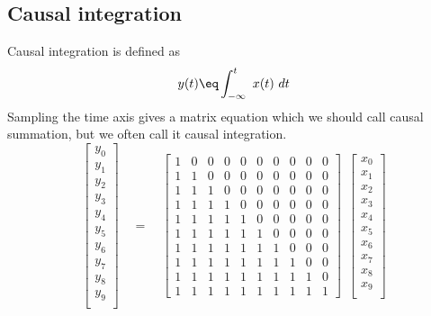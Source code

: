 \subsection{Causal integration}
Causal integration is defined as
\begin{equation}
y(t) \eq \int_{-\infty}^t \ x(t)\ dt
\end{equation}
Sampling the time axis gives a matrix equation which
we should call causal summation, but we often call it causal integration.
\begin{equation}
  \left[
	\begin{array}{c}
		y_0 \\
		y_1 \\
		y_2 \\
		y_3 \\
		y_4 \\
		y_5 \\
		y_6 \\
		y_7 \\
		y_8 \\
		y_9 \\
	\end{array}
  \right]
 \quad = \quad
  \left[
	\begin{array}{ccccccccccc}
	1 &0 &0 &0 &0 &0 &0 &0 &0 &0 \\
	1 &1 &0 &0 &0 &0 &0 &0 &0 &0 \\
	1 &1 &1 &0 &0 &0 &0 &0 &0 &0 \\
	1 &1 &1 &1 &0 &0 &0 &0 &0 &0 \\
	1 &1 &1 &1 &1 &0 &0 &0 &0 &0 \\
	1 &1 &1 &1 &1 &1 &0 &0 &0 &0 \\
	1 &1 &1 &1 &1 &1 &1 &0 &0 &0 \\
	1 &1 &1 &1 &1 &1 &1 &1 &0 &0 \\
	1 &1 &1 &1 &1 &1 &1 &1 &1 &0 \\
	1 &1 &1 &1 &1 &1 &1 &1 &1 &1 
	\end{array}
  \right]
  \ \ 
  \left[
	\begin{array}{c}
		x_0 \\
		x_1 \\
		x_2 \\
		x_3 \\
		x_4 \\
		x_5 \\
		x_6 \\
		x_7 \\
		x_8 \\
		x_9 \\
	\end{array}
  \right]
\label{eqn:mytri}
\end{equation}
